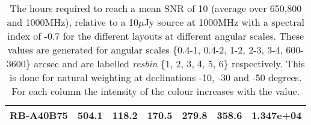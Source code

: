 \begin{table}[!htp]
{{\begin{tabular}{|lcccccc|}
RB-A40B75 & 504.1 \cellcolor{blue!25.35} & 118.2 \cellcolor{red!39.56} & 170.5 \cellcolor{green!42.14} & 279.8 \cellcolor{orange!49.61} & 358.6 \cellcolor{purple!50.36} & 1.347e+04 \cellcolor{blue!51.11}\tabularnewline \hline 
\end{tabular}}\hfill \\
\hfill \\

\caption{The hours required to reach a mean SNR of 10 (average over 650,800 and 1000MHz), relative to a 10$\mu$Jy source at 1000MHz with a spectral index of -0.7 for the different layouts at different angular scales. These values are generated for angular scales \{0.4-1, 0.4-2, 1-2, 2-3, 3-4, 600-3600\} arcsec and are labelled {\it resbin} \{1, 2, 3, 4, 5, 6\} respectively. This is done for natural weighting at declinations -10, -30 and -50 degrees. For each column the intensity of the colour increases with the value.}\label{tab:hours-new}}
 \end{table}
